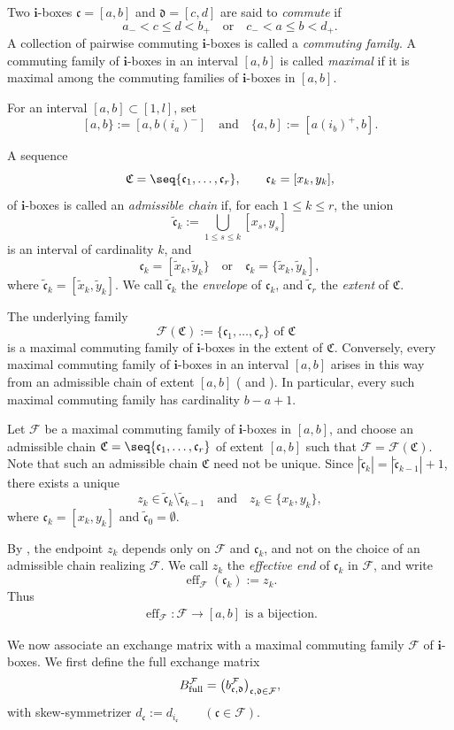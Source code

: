 \documentclass[12pt, leqno]{amsart}
\numberwithin{equation}{section}
\theoremstyle{plain}
\theoremstyle{definition}
\renewcommand{\le}{\leqslant}
\newcommand{\seteq}{\mathbin{:=}}
\newcommand{\full}{{\rm full}}
\newcommand{\eff}{\operatorname{eff}}
\newcommand{\tx}{\widetilde{x}}
\newcommand{\ty}{\widetilde{y}}
\newcommand{\frakC}{\mathfrak{C}}
\newcommand{\frakc}{\mathfrak{c}}
\newcommand{\frakd}{\mathfrak{d}}
\newcommand{\tfrakc}{\widetilde{\frakc}}
\newcommand{\bfi}{\mathbf{i}}
\newcommand{\calF}{\mathcal{F}}
\newcommand{\qtq}[1][{and}]{\quad\text{{#1}}\quad}
\newcommand{\qtoq}[1][{or}]{\quad\text{{#1}}\quad}
\begin{document}
Two $\bfi$-boxes $\frakc=[a,b]$ and $\frakd=[c,d]$
are said to \emph{commute} if
\[
a_-<c\le d<b_+ \qtoq  c_-<a\le b<d_+.
\]
A collection of pairwise commuting $\bfi$-boxes is called a
\emph{commuting family}. A commuting family of $\bfi$-boxes in an interval $[a,b]$ is called
\emph{maximal} if it is maximal among the commuting families of
$\bfi$-boxes in $[a,b]$.

For an interval $[a,b]\subset[1,l]$, set
\[
[a,b\}\seteq[a,b(i_a)^-] \qtq \{a,b]\seteq[a(i_b)^+,b].
\]

A sequence
\[
\frakC=\seq{\frakc_1,\ldots,\frakc_r}, \qquad \frakc_k=[x_k,y_k],
\]
of $\bfi$-boxes is called an \emph{admissible chain} if, for each
$1\le k\le r$, the union
\[
\tfrakc_k \seteq \bigcup_{1\le s\le k}[x_s,y_s]
\]
is an interval of cardinality $k$, and
\[
\frakc_k=[\tx_k,\ty_k\} \quad\text{or}\quad \frakc_k=\{\tx_k,\ty_k],
\]
where $\tfrakc_k=[\tx_k,\ty_k]$. We call $\tfrakc_k$ the \emph{envelope} of $\frakc_k$, and $\tfrakc_r$ the \emph{extent} of $\frakC$.

The underlying family
$$\calF(\frakC) \seteq \{\frakc_1,\ldots,\frakc_r\} \text{ of $\frakC$ }$$
is a maximal commuting family of $\bfi$-boxes in the extent of
$\frakC$. Conversely, every maximal commuting family of
$\bfi$-boxes in an interval $[a,b]$ arises in this way from an
admissible chain of extent $[a,b]$ (\cite[Proposition~5.3]{KKOP24A} and \cite[Corollary~2.10]{KK24}).
In particular, every such maximal commuting family has cardinality
$b-a+1$.

Let $\calF$ be a maximal commuting family of $\bfi$-boxes in
$[a,b]$, and choose an admissible chain
$\frakC=\seq{\frakc_1,\ldots,\frakc_r}$
of extent $[a,b]$ such that $\calF=\calF(\frakC)$. Note that such an admissible chain $\frakC$ need not be unique.
Since $|\tfrakc_k|=|\tfrakc_{k-1}|+1$, there exists a unique
\[
z_k\in\tfrakc_k\setminus\tfrakc_{k-1} \qtq z_k\in\{x_k,y_k\},
\]
where $\frakc_k=[x_k,y_k]$ and $\tfrakc_0=\emptyset$.

By \cite[Proposition~2.12]{KK24}, the endpoint $z_k$ depends only on
$\calF$ and $\frakc_k$, and not on the choice of an admissible chain
realizing $\calF$. We call $z_k$ the \emph{effective end} of
$\frakc_k$ in $\calF$, and write
\[
\eff_{\calF}(\frakc_k)\seteq z_k.
\]
Thus
\begin{align} \label{eq: eff_F}
\eff_{\calF}:\calF\longrightarrow[a,b] \text{ is a bijection.}
\end{align}

We now associate an exchange matrix with a maximal commuting family
$\calF$ of $\bfi$-boxes. We first define the full exchange matrix
\[
B^\calF_{\full} = \bigl(b^\calF_{\frakc,\frakd}\bigr)_{\frakc,\frakd\in\calF},
\]
with skew-symmetrizer $d_{\frakc}\seteq d_{i_{\frakc}} \qquad(\frakc\in\calF)$.
\end{document}
